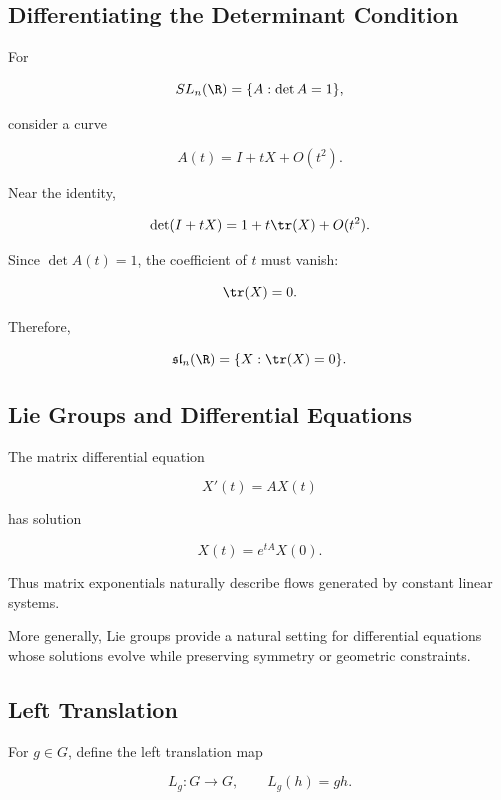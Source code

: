 \subsection{Differentiating the Determinant Condition}
\label{subsec:differentiating-determinant}

For

\[ SL_n(\R)=\{A:\det A=1\}, \]

consider a curve

\[ A(t)=I+tX+O(t^2). \]

Near the identity,

\[ \det(I+tX)=1+t\tr(X)+O(t^2). \]

Since \(\det A(t)=1\), the coefficient of \(t\) must vanish:

\[ \tr(X)=0. \]

Therefore,

\[ \mathfrak{sl}_n(\R)=\{X:\tr(X)=0\}. \]

\subsection{Lie Groups and Differential Equations}
\label{subsec:lie-groups-differential-equations}

The matrix differential equation

\[ X'(t)=AX(t) \]

has solution

\[ X(t)=e^{tA}X(0). \]

Thus matrix exponentials naturally describe flows generated by constant
linear systems.

More generally, Lie groups provide a natural setting for differential
equations whose solutions evolve while preserving symmetry or geometric
constraints.

\subsection{Left Translation}
\label{subsec:left-translation}

For \(g\in G\), define the left translation map

\[ L_g:G\to G,\qquad L_g(h)=gh. \]

